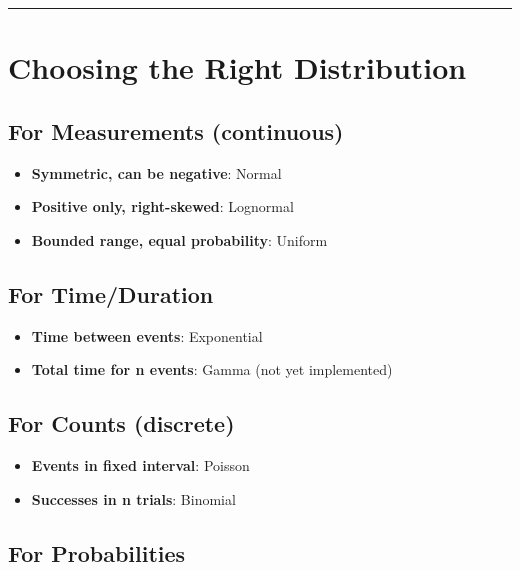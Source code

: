 \documentclass[
  letterpaper,
]{scrbook}
\providecommand{\tightlist}{%
  \setlength{\itemsep}{0pt}\setlength{\parskip}{0pt}}
\begin{document}
\begin{center}\rule{0.5\linewidth}{0.5pt}\end{center}

\section{Choosing the Right
Distribution}\label{choosing-the-right-distribution}

\subsection{For Measurements
(continuous)}\label{for-measurements-continuous}

\begin{itemize}
\tightlist
\item
  \textbf{Symmetric, can be negative}: Normal
\item
  \textbf{Positive only, right-skewed}: Lognormal
\item
  \textbf{Bounded range, equal probability}: Uniform
\end{itemize}

\subsection{For Time/Duration}\label{for-timeduration}

\begin{itemize}
\tightlist
\item
  \textbf{Time between events}: Exponential
\item
  \textbf{Total time for n events}: Gamma (not yet implemented)
\end{itemize}

\subsection{For Counts (discrete)}\label{for-counts-discrete}

\begin{itemize}
\tightlist
\item
  \textbf{Events in fixed interval}: Poisson
\item
  \textbf{Successes in n trials}: Binomial
\end{itemize}

\subsection{For Probabilities}\label{for-probabilities}
\end{document}
